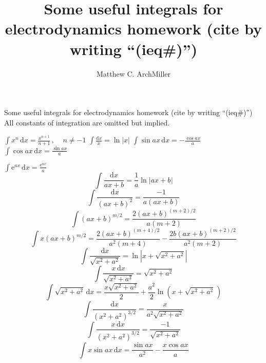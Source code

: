 \documentclass[fleqn,leqno]{article}
\title{Some useful integrals for electrodynamics homework (cite by writing ``(ieq\#)'')}
\author{Matthew C. ArchMiller}
\providecommand*{\diff}{\ensuremath{\mathrm{d}}}
\providecommand*{\En}{\ensuremath{\mathrm{e}}}
\begin{document}
Some useful integrals for electrodynamics homework (cite by writing ``(ieq\#)'')\\
All constants of integration are omitted but implied.


$\int x^n\, \diff x = \frac{x^{n+1}}{n+1}\,, \mspace{20mu} n\ne-1$
\hfill{}
$\int \frac{\diff x}{x} = \ln |x|$
\hfill{}
$\int \sin ax\, \diff x = - \frac{\cos ax}{a}$
\hfill{}
$\int \cos ax\, \diff x = \frac{\sin ax}{a}$

$\int \En^{ax}\, \diff x = \frac{\En^{ax}}{a}$
\hfill{}
%
%
\begin{equation}
	\int \frac{\diff x}{ax + b} = \frac{1}{a}\ln |ax+b\mspace{1mu}|
\end{equation}
%
%
\begin{equation}
	\int \frac{\diff x}{(ax + b)^2} = \frac{-1}{a(ax+b)}
\end{equation}
%
\begin{equation}
	\int (ax + b)^{m/2} = \frac{2(ax+b)^{(m+2)/2}}{a(m+2)}
\end{equation}
%
\begin{equation}
	\int x(ax + b)^{m/2} = \frac{2(ax+b)^{(m+4)/2}}{a^2(m+4)} - 
		\frac{2b(ax+b)^{(m+2)/2}}{a^2(m+2)}
\end{equation}
%
%
\begin{equation}
	\int \frac{\diff x}{\sqrt{x^2 + a^2}} = \ln \left|x + \sqrt{x^2 + a^2} \right|
\end{equation}
%
%
\begin{equation}
	\int \frac{x \,\diff x}{\sqrt{x^2 + a^2}} = \sqrt{x^2 + a^2}
\end{equation}
%
%
\begin{equation}
	\int \sqrt{x^2 + a^2}\, \diff x = \frac{x \sqrt{x^2 + a^2}}{2} + 
		\frac{a^2}{2} \ln\left( x + \sqrt{x^2 + a^2} \mspace{2mu}\right)
\end{equation}
%
%
\begin{equation}
	\int \frac{\diff x}{(x^2 + a^2)^{3/2}} = \frac{x}{a^2\sqrt{x^2 + a^2}}
\end{equation}
%
%
\begin{equation}
	\int \frac{x \,\diff x}{(x^2 + a^2)^{3/2}} = \frac{-1}{\sqrt{x^2 + a^2}}
\end{equation}
%
%
%
%
\begin{equation}
	\int x\sin ax\, \diff x = \frac{\sin ax}{a^2} - \frac{x\cos ax}{a}
\end{equation}
\end{document}
